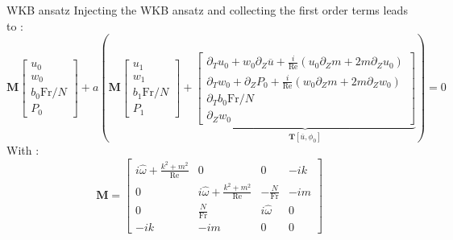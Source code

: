 \documentclass[10pt]{beamer}
\begin{document}
\begin{frame}[fragile]{WKB ansatz}
	Injecting the WKB ansatz and collecting the first order terms leads to :
  	\begin{equation*}\!\!\!\!\!\!\!\!\!\!\!\!\!\!\!\!\!
  		\mathbf{M}
  		\begin{bmatrix}
  			u_{0}\\
  			w_{0}\\
  			b_{0}\mathrm{Fr}/N\\
  			P_{0}
  		\end{bmatrix}
  		+a\left(\mathbf{M}
  		\begin{bmatrix}
  			u_{1}\\
  			w_{1}\\
  			b_{1}\mathrm{Fr}/N\\
  			P_{1}
  		\end{bmatrix}+
  		\underbrace{\begin{bmatrix}
  			\partial_{T}u_{0}+w_{0}\partial_{Z}\overline{u}+\frac{i}{\mathrm{Re}}\left(u_{0}\partial_{Z}m+2m\partial_{Z}u_{0} \right)\\
  			\partial_{T}w_{0}+\partial_{Z}P_{0}+\frac{i}{\mathrm{Re}}\left(w_{0}\partial_{Z}m+2m\partial_{Z}w_{0} \right)\\
  			\partial_{T}b_{0}\mathrm{Fr}/N\\
  			\partial_{Z}w_{0}
  		\end{bmatrix}}_{\boldsymbol{T}\left[\overline{u},\phi_{0}\right]}
  	 	\right) =0
  	\end{equation*}
  With : 
  \begin{equation*}
  	\mathbf{M} =
  	\begin{bmatrix}
  		i\hat{\omega}+\frac{k^{2}+m^{2}}{\mathrm{Re}} 	&  0  &  0 & -ik  \\
  		0	& i\hat{\omega}+\frac{k^{2}+m^{2}}{\mathrm{Re}}  & -\frac{N}{\mathrm{Fr}} & -im\\
  		0   &  \frac{N}{\mathrm{Fr}}  &  i\hat{\omega} & 0\\
  		-ik  &  -im  &  0  &  0
  	\end{bmatrix}
  \end{equation*}
\end{frame}
\end{document}
